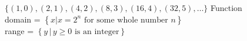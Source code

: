 { $\{(1, 0), (2, 1), (4, 2), (8, 3), (16, 4), (32, 5), \ldots\}$}
{Function \\ domain = $\left\{x | \text{$x = 2^{n}$ for some whole number $n$} \right\}$ \\ range = $\left\{y \, | \, \text{$y\geq 0$ is an integer}\right\}$ }